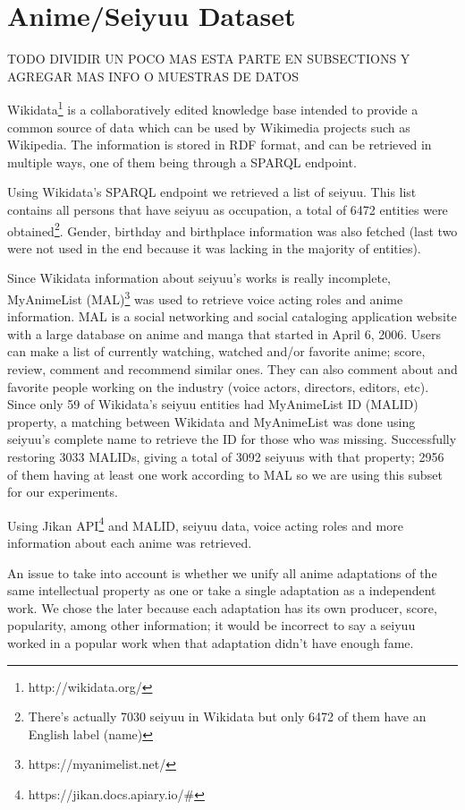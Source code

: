 \chapter{Anime/Seiyuu Dataset}

TODO DIVIDIR UN POCO MAS ESTA PARTE EN SUBSECTIONS Y AGREGAR MAS INFO O MUESTRAS DE DATOS

Wikidata\footnote{http://wikidata.org/} is a collaboratively edited knowledge base intended to provide a common source of data which can be used by Wikimedia projects such as Wikipedia. The information is stored in RDF format, and can be retrieved in multiple ways, one of them being through a SPARQL endpoint.

Using Wikidata's SPARQL endpoint we retrieved a list of seiyuu. This list contains all persons that have seiyuu as occupation, a total of 6472 entities were obtained\footnote{There's actually 7030 seiyuu in Wikidata but only 6472 of them have an English label (name)}. Gender, birthday and birthplace information was also fetched (last two were not used in the end because it was lacking in the majority of entities).

Since Wikidata information about seiyuu's works is really incomplete, MyAnimeList (MAL)\footnote{https://myanimelist.net/} was used to retrieve voice acting roles and anime information. MAL is a social networking and social cataloging application website with a large database on anime and manga that started in April 6, 2006. Users can make a list of currently watching, watched and/or favorite anime; score, review, comment and recommend similar ones. They can also comment about and favorite people working on the industry (voice actors, directors, editors, etc).\\


Since only 59 of Wikidata's seiyuu entities had MyAnimeList ID (MALID) property, a matching between Wikidata and MyAnimeList was done using seiyuu's complete name to retrieve the ID for those who was missing. Successfully restoring 3033 MALIDs, giving a total of 3092 seiyuus with that property; 2956 of them having at least one work according to MAL so we are using this subset for our experiments.

Using Jikan API\footnote{https://jikan.docs.apiary.io/\#} and MALID, seiyuu data, voice acting roles and more information about each anime was retrieved. 

An issue to take into account is whether we unify all anime adaptations of the same intellectual property as one or take a single adaptation as a independent work. We chose the later because each adaptation has its own producer, score, popularity, among other information; it would be incorrect to say a seiyuu worked in a popular work when that adaptation didn't have enough fame.\\

